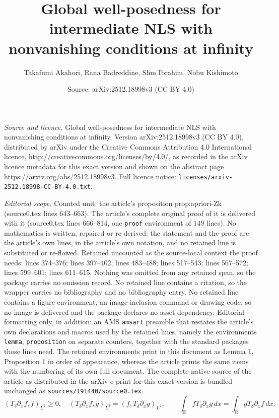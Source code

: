 \documentclass[10pt,a4paper]{amsart}
\title{Global well-posedness for intermediate NLS with nonvanishing conditions at infinity}
\author{Takafumi Akahori, Rana Badreddine, Slim Ibrahim, Nobu Kishimoto}
\date{Source: arXiv:2512.18998v3 (CC BY 4.0)}
\newcommand{\R}{\mathbb{R}}
\newcommand{\Td}{T_{\delta}}
\begin{document}
\maketitle

\noindent\emph{Source and licence.} Global well-posedness for intermediate NLS with nonvanishing conditions at infinity. Version arXiv:2512.18998v3 (CC BY 4.0), distributed by arXiv under the Creative Commons Attribution 4.0 International licence, http://creativecommons.org/licenses/by/4.0/, as recorded in the arXiv licence metadata for this exact version and shown on the abstract page https://arxiv.org/abs/2512.18998v3. Full licence notice: \texttt{licenses/arxiv-2512.18998-CC-BY-4.0.txt}.\par\smallskip

\noindent\textit{Editorial scope.} Counted unit: the article's proposition prop:apriori-Zk (source0.tex lines 643--663). The article's complete original proof of it is delivered with it (source0.tex lines 666--814, one \texttt{proof} environment of 149 lines). No mathematics is written, repaired or re-derived: the statement and the proof are the article's own lines, in the article's own notation, and no retained line is substituted or re-flowed.  Retained uncounted as the source-local context the proof needs: lines 374--376; lines 397--402; lines 483--488; lines 517--543; lines 567--572; lines 599--601; lines 611--615.  Nothing was omitted from any retained span, so the package carries no omission record.  No retained line contains a citation, so the wrapper carries no bibliography and no bibliography entry.  No retained line contains a figure environment, an image-inclusion command or drawing code, so no image is delivered and the package declares no asset dependency.  Editorial formatting only, in addition: an AMS \texttt{amsart} preamble that restates the article's own declarations and macros used by the retained lines, namely the environments \texttt{lemma}, \texttt{proposition} on separate counters, together with the standard packages those lines need.  The retained environments print in this document as Lemma 1, Proposition 1 in order of appearance, whereas the article prints the same items with the numbering of its own full document.  The complete native source of the article as distributed in the arXiv e-print for this exact version is bundled unchanged as \texttt{sources/191440/source0.tex}.
\begin{equation}\label{id:Tdeltasymm}
\left( \Td\partial_xf,f\right)_{L^2} \geq 0,\quad \left( \Td\partial_x f,g\right)_{L^2} =\left( f,\Td\partial_xg\right)_{L^2} ,\qquad \int_{\R} f\Td\partial_xg\,dx=\int_{\R}g\Td\partial_xf\,dx ,
\end{equation}
\end{document}
